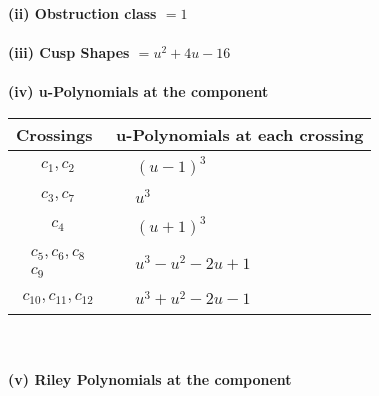 \documentclass[1p]{elsarticle_modified}
\theoremstyle{definition}
\begin{document}
\flushleft \textbf{(ii) Obstruction class $= 1$}\\~\\
\flushleft \textbf{(iii) Cusp Shapes $= u^2+4 u-16$}\\~\\
\newpage\renewcommand{\arraystretch}{1}
\flushleft \textbf{(iv) u-Polynomials at the component}\newline \\
\begin{tabular}{m{50pt}|m{274pt}}
Crossings & \hspace{64pt}u-Polynomials at each crossing \\
\hline $$\begin{aligned}c_{1},c_{2}\end{aligned}$$&$\begin{aligned}
&(u-1)^3
\end{aligned}$\\
\hline $$\begin{aligned}c_{3},c_{7}\end{aligned}$$&$\begin{aligned}
&u^3
\end{aligned}$\\
\hline $$\begin{aligned}c_{4}\end{aligned}$$&$\begin{aligned}
&(u+1)^3
\end{aligned}$\\
\hline $$\begin{aligned}c_{5},c_{6},c_{8}\\c_{9}\end{aligned}$$&$\begin{aligned}
&u^3- u^2-2 u+1
\end{aligned}$\\
\hline $$\begin{aligned}c_{10},c_{11},c_{12}\end{aligned}$$&$\begin{aligned}
&u^3+u^2-2 u-1
\end{aligned}$\\
\hline
\end{tabular}\\~\\
\newpage\renewcommand{\arraystretch}{1}
\flushleft \textbf{(v) Riley Polynomials at the component}\newline \\
\end{document}
